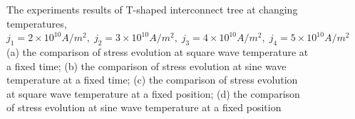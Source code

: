 \begin{figure}[!h]
{\label{fig:CT2Length}}
\caption{The experiments results of T-shaped interconnect tree at changing temperatures, $j_1=2\times10^{10}A/m^2,\;j_2=3\times10^{10}A/m^2,\;j_3=4\times10^{10}A/m^2,\;
j_4=5\times10^{10}A/m^2$ (a) the comparison of stress evolution at square wave temperature at a fixed time; (b) the comparison of stress evolution at sine wave temperature at a fixed time; (c) the comparison of stress evolution at square wave temperature at a fixed position; (d) the comparison of stress evolution at sine wave temperature at a fixed position}
\label{fig:CResults}
\end{figure}